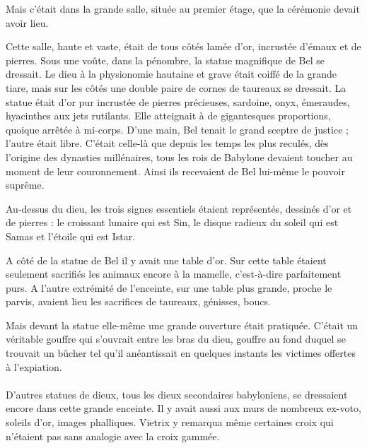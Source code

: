 \documentclass[a4paper, 11pt, oneside, polutonikogreek, french]{article}
\begin{document}
\bigskip
\centerline{\EightStarTaper}
\centerline{\EightStarTaper\EightStarTaper}
\bigskip

Mais c'était dans la grande salle, située au premier étage, que la cérémonie devait avoir lieu.

Cette salle, haute et vaste, était de tous côtés lamée d'or, incrustée d'émaux et de pierres. Sous une voûte, dans la pénombre, la statue magnifique de Bel se dressait. Le dieu à la physionomie hautaine et grave était coiffé de la grande tiare, mais sur les côtés une double paire de cornes de taureaux se dressait. La statue était d'or pur incrustée de pierres précieuses, sardoine, onyx, émeraudes, hyacinthes aux jets rutilants. Elle atteignait à de gigantesques proportions, quoique arrêtée à mi-corps. D'une main, Bel tenait le grand sceptre de justice ; l'autre était libre. C'était celle-là que depuis les temps les plus reculés, dès l'origine des dynasties millénaires, tous les rois de Babylone devaient toucher au moment de leur couronnement. Ainsi ils recevaient de Bel lui-même le pouvoir suprême.

\bigskip
\centerline{\EightStarTaper}
\centerline{\EightStarTaper\EightStarTaper}
\bigskip

Au-dessus du dieu, les trois signes essentiels étaient représentés, dessinés d'or et de pierres : le croissant lunaire qui est Sin, le disque radieux du soleil qui est Samas et l'étoile qui est Istar.

A côté de la statue de Bel il y avait une table d'or. Sur cette table étaient seulement sacrifiés les animaux encore à la mamelle, c'est-à-dire parfaitement purs. A l'autre extrémité de l'enceinte, sur une table plus grande, proche le parvis, avaient lieu les sacrifices de taureaux, génisses, boucs.

Mais devant la statue elle-même une grande ouverture était pratiquée. C'était un véritable gouffre qui s'ouvrait entre les bras du dieu, gouffre au fond duquel se trouvait un bûcher tel qu'il anéantissait en quelques instants les victimes offertes à l'expiation.
\clearpage
\paragraph{}
D'autres statues de dieux, tous les dieux secondaires babyloniens, se dressaient encore dans cette grande enceinte. Il y avait aussi aux murs de nombreux ex-voto, soleils d'or, images phalliques. Vietrix y remarqua même certaines croix qui n'étaient pas sans analogie avec la croix gammée.
\end{document}
